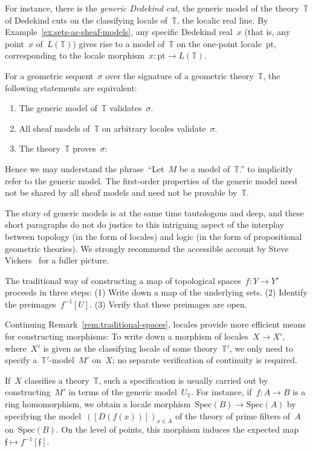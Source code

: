\documentclass{ws-rv9x6}
\newcommand{\TT}{\mathbb{T}}
\newcommand{\fff}{\mathfrak{f}}
\newcommand{\Spec}{\mathrm{Spec}}
\renewcommand{\_}{\mathpunct{.}}
\newcommand{\?}{\,{:}\,}
\newcommand{\pt}{\mathrm{pt}}
\begin{document}
For instance, there is the \emph{generic Dedekind cut}, the generic model of
the theory~$\TT$ of Dedekind cuts on the classifying locale of~$\TT$, the
localic real line. By Example~\ref{ex:sets-as-sheaf-models}, any specific Dedekind
real~$x$ (that is, any point~$x$ of~$L(\TT)$) gives rise to a model of~$\TT$ on
the one-point locale~$\pt$, corresponding to the locale morphism~$x : \pt \to
L(\TT)$.

For a geometric sequent~$\sigma$ over the signature of a geometric
theory~$\TT$, the following statements are equivalent:
\begin{enumerate}
\item The generic model of~$\TT$ validates~$\sigma$.
\item All sheaf models of~$\TT$ on arbitrary locales validate~$\sigma$.
\item The theory~$\TT$ proves~$\sigma$:
\end{enumerate}
Hence we may understand the phrase~``Let~$M$ be a model of~$\TT$.'' to
implicitly refer to the generic model. The first-order properties of the
generic model need not be shared by all sheaf models and need not be provable
by~$\TT$.

The story of generic models is at the same time tautologous and deep, and these
short paragraphs do not do justice to this intriguing aspect of the interplay
between topology (in the form of locales) and logic (in the form of
propositional geometric theories). We strongly
recommend the accessible account by Steve Vickers~\cite{vickers:continuity} for a fuller
picture.

\begin{remark}The traditional way of constructing a map of topological spaces~$f : Y \to
Y'$ proceeds in three steps: (1) Write down a map of the underlying sets. (2)
Identify the preimages~$f^{-1}[U]$. (3) Verify that these preimages are open.

Continuing Remark~\ref{rem:traditional-spaces}, locales provide more
efficient means for constructing morphisms: To write down a morphism of
locales~$X \to X'$, where~$X'$ is given as the classifying locale of some
theory~$\TT'$, we only need to specify a~$\TT'$-model~$M'$ on~$X$; no separate
verification of continuity is required.

If~$X$ classifies a theory~$\TT$, such a specification is usually carried out
by constructing~$M'$ in terms of the generic model~$U_\TT$.
For instance, if~$f : A \to B$ is a ring homomorphism, we obtain a locale
morphism~$\Spec(B) \to \Spec(A)$ by specifying the model~$([D(f(x))])_{x \in
A}$ of the theory of prime filters of~$A$ on~$\Spec(B)$. On the level of
points, this morphism induces the expected map~$\fff \mapsto f^{-1}[\fff]$.
\end{remark}
\end{document}
